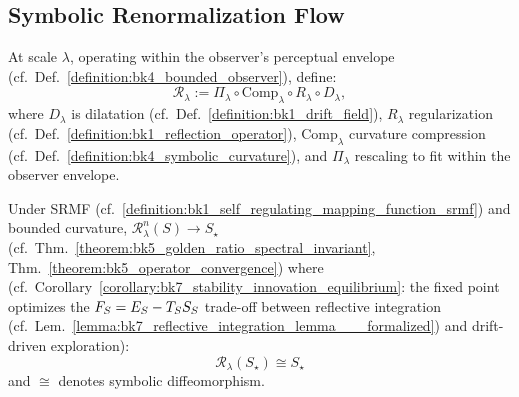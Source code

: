 \subsection{Symbolic Renormalization Flow}
\label{sec:bk8_symbolic_renormalization_flow}
\begin{definition}
\label{definition:bk8_sr_renormalization_group}
At scale \( \lambda \), operating within the observer's perceptual envelope (cf.~Def.~\ref{definition:bk4_bounded_observer}), define:
\[
\mathcal{R}_\lambda := \Pi_\lambda \circ \mathrm{Comp}_\lambda \circ R_\lambda \circ D_\lambda,
\]
where \( D_\lambda \) is dilatation (cf.~Def.~\ref{definition:bk1_drift_field}), \( R_\lambda \) regularization (cf.~Def.~\ref{definition:bk1_reflection_operator}), \( \mathrm{Comp}_\lambda \) curvature compression (cf.~Def.~\ref{definition:bk4_symbolic_curvature}), and \( \Pi_\lambda \) rescaling to fit within the observer envelope.
\end{definition}
\begin{theorem}
\label{theorem:bk8_rg_fixed_point}
Under SRMF (cf.~\ref{definition:bk1_self_regulating_mapping_function_srmf}) and bounded curvature, \( \mathcal{R}_\lambda^n(S) \to S_\star \) (cf.~Thm.~\ref{theorem:bk5_golden_ratio_spectral_invariant}, Thm.~\ref{theorem:bk5_operator_convergence}) where (cf.~Corollary~\ref{corollary:bk7_stability_innovation_equilibrium}: the fixed point optimizes the $F_S = E_S - T_SS_S$ trade-off between reflective integration (cf.~Lem.~\ref{lemma:bk7_reflective_integration_lemma___formalized}) and drift-driven exploration):
\[
\mathcal{R}_\lambda(S_\star) \cong S_\star
\]
and \( \cong \) denotes symbolic diffeomorphism.
\end{theorem}
